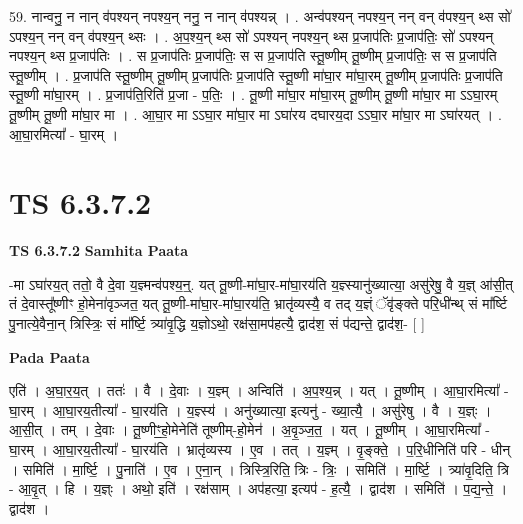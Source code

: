 \documentclass[17pt]{extarticle}
\begin{document}
59. नान्वनु॒ न नान् व॑पश्यन् नपश्य॒न् ननु॒ न नान् व॑पश्यन्न् । . अन्व॑पश्यन् नपश्य॒न् नन् वन् व॑पश्य॒न् थ्स सो॑ ऽपश्य॒न् नन् वन् व॑पश्य॒न् थ्सः । . अ॒प॒श्य॒न् थ्स सो॑ ऽपश्यन् नपश्य॒न् थ्स प्र॒जाप॑तिः प्र॒जाप॑तिः॒ सो॑ ऽपश्यन् नपश्य॒न् थ्स प्र॒जाप॑तिः । . स प्र॒जाप॑तिः प्र॒जाप॑तिः॒ स स प्र॒जाप॑ति स्तू॒ष्णीम् तू॒ष्णीम् प्र॒जाप॑तिः॒ स स प्र॒जाप॑ति स्तू॒ष्णीम् । . प्र॒जाप॑ति स्तू॒ष्णीम् तू॒ष्णीम् प्र॒जाप॑तिः प्र॒जाप॑ति स्तू॒ष्णी मा॑घा॒र मा॑घा॒रम् तू॒ष्णीम् प्र॒जाप॑तिः प्र॒जाप॑ति स्तू॒ष्णी मा॑घा॒रम् । . प्र॒जाप॑ति॒रिति॑ प्र॒जा - प॒तिः॒ । . तू॒ष्णी मा॑घा॒र मा॑घा॒रम् तू॒ष्णीम् तू॒ष्णी मा॑घा॒र मा ऽऽघा॒रम् तू॒ष्णीम् तू॒ष्णी मा॑घा॒र मा । . आ॒घा॒र मा ऽऽघा॒र मा॑घा॒र मा ऽघा॑रय दघारय॒दा ऽऽघा॒र मा॑घा॒र मा ऽघा॑रयत् । . आ॒घा॒रमित्या᳚ - घा॒रम् । \newline
\pagebreak
{}

\section{ TS 6.3.7.2 }

\textbf{TS 6.3.7.2 } \newline
\textbf{Samhita Paata} \newline

-मा ऽघा॑रय॒त् ततो॒ वै दे॒वा य॒ज्ञ्मन्व॑पश्य॒न्॒. यत् तू॒ष्णी-मा॑घा॒र-मा॑घा॒रय॑ति य॒ज्ञ्स्यानु॑ख्यात्या॒ असु॑रेषु॒ वै य॒ज्ञ् आ॑सी॒त् तं दे॒वास्तू᳚ष्णीꣳ हो॒मेना॑वृञ्जत॒ यत् तू॒ष्णी-मा॑घा॒र-मा॑घा॒रय॑ति॒ भ्रातृ॑व्यस्यै॒ व तद् य॒ज्ञ्ं ॅवृ॑ङ्क्ते परि॒धी॑न्थ् सं मा᳚र्ष्टि पु॒नात्ये॒वैना॒न् त्रिस्त्रिः॒ सं मा᳚र्ष्टि॒ त्र्या॑वृ॒द्धि य॒ज्ञोऽथो॒ रक्ष॑सा॒मप॑हत्यै॒ द्वाद॑श॒ सं प॑द्यन्ते॒ द्वाद॑श॒- [  ] \newline

\textbf{Pada Paata} \newline

एति॑ । अ॒घा॒र॒य॒त् । ततः॑ । वै । दे॒वाः । य॒ज्ञ्म् । अन्विति॑ । अ॒प॒श्य॒न्न् । यत् । तू॒ष्णीम् । आ॒घा॒रमित्या᳚ - घा॒रम् । आ॒घा॒रय॒तीत्या᳚ - घा॒रय॑ति । य॒ज्ञ्स्य॑ । अनु॑ख्यात्या॒ इत्यनु॑ - ख्या॒त्यै॒ । असु॑रेषु । वै । य॒ज्ञ्ः । आ॒सी॒त् । तम् । दे॒वाः । तू॒ष्णीꣳ॒॒हो॒मेनेति॑ तूष्णीम्-हो॒मेन॑ । अ॒वृ॒ञ्ज॒त॒ । यत् । तू॒ष्णीम् । आ॒घा॒रमित्या᳚ - घा॒रम् । आ॒घा॒रय॒तीत्या᳚ - घा॒रय॑ति । भ्रातृ॑व्यस्य । ए॒व । तत् । य॒ज्ञ्म् । वृ॒ङ्क्ते॒ । प॒रि॒धीनिति॑ परि - धीन् । समिति॑ । मा॒र्ष्टि॒ । पु॒नाति॑ । ए॒व । ए॒ना॒न् । त्रिस्त्रि॒रिति॒ त्रिः - त्रिः॒ । समिति॑ । मा॒र्ष्टि॒ । त्र्या॑वृ॒दिति॒ त्रि - आ॒वृ॒त् । हि । य॒ज्ञ्ः । अथो॒ इति॑ । रक्ष॑साम् । अप॑हत्या॒ इत्यप॑ - ह॒त्यै॒ । द्वाद॑श । समिति॑ । प॒द्य॒न्ते॒ । द्वाद॑श ।  \newline
\end{document}
